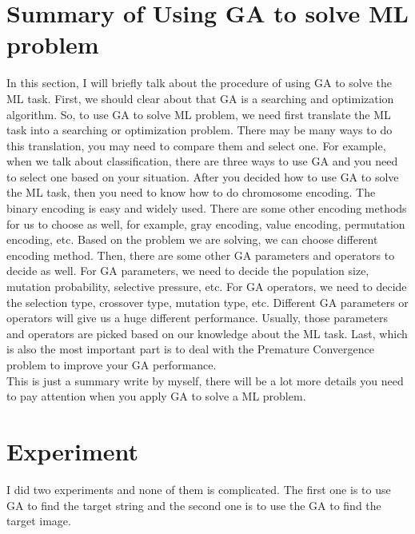 \documentclass{article}
\begin{document}
\section{Summary of Using GA to solve ML problem}
In this section, I will briefly talk about the procedure of using GA to solve the ML task. First, we should clear about that GA is a searching and optimization algorithm. So, to use GA to solve ML problem, we need first translate the ML task into a searching or optimization problem. There may be many ways to do this translation, you may need to compare them and select one. For example, when we talk about classification, there are three ways to use GA and you need to select one based on your situation. After you decided how to use GA to solve the ML task, then you need to know how to do chromosome encoding. The binary encoding is easy and widely used. There are some other encoding methods for us to choose as well, for example, gray encoding, value encoding, permutation encoding, etc. Based on the problem we are solving, we can choose different encoding method. Then, there are some other GA parameters and operators to decide as well. For GA parameters, we need to decide the population size, mutation probability, selective pressure, etc. For GA operators, we need to decide the selection type, crossover type, mutation type, etc. Different GA parameters or operators will give us a huge different performance. Usually, those parameters and operators are picked based on our knowledge about the ML task. Last, which is also the most important part is to deal with the Premature Convergence problem to improve your GA performance.\\

This is just a summary write by myself, there will be a lot more details you need to pay attention when you apply GA to solve a ML problem.

\section{Experiment}
I did two experiments and none of them is complicated. The first one is to use GA to find the target string and the second one is to use the GA to find the target image.
\end{document}
